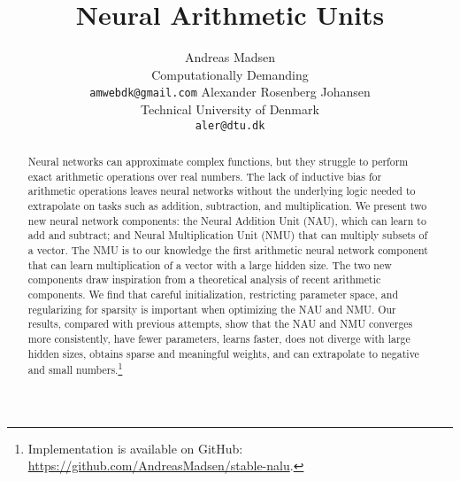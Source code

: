 \documentclass{article}
\title{Neural Arithmetic Units}
\author{%
  Andreas Madsen \\
  Computationally Demanding \\
  \texttt{amwebdk@gmail.com}
  \And
  Alexander Rosenberg Johansen \\
  Technical University of Denmark \\
  \texttt{aler@dtu.dk} \\
}
\begin{document}
\maketitle

\begin{abstract}


Neural networks can approximate complex functions, but they struggle to perform exact arithmetic operations over real numbers.
The lack of inductive bias for arithmetic operations leaves neural networks without the underlying logic needed to extrapolate on tasks such as addition, subtraction, and multiplication.
We present two new neural network components: the Neural Addition Unit (NAU), which can learn to add and subtract; and Neural Multiplication Unit (NMU) that can multiply subsets of a vector.
The NMU is to our knowledge the first arithmetic neural network component that can learn multiplication of a vector with a large hidden size.
The two new components draw inspiration from a theoretical analysis of recent arithmetic components.
We find that careful initialization, restricting parameter space, and regularizing for sparsity is important when optimizing the NAU and NMU.
Our results, compared with previous attempts, show that the NAU and NMU converges more consistently, have fewer parameters, learns faster, does not diverge with large hidden sizes, obtains sparse and meaningful weights, and can extrapolate to negative and small numbers.\ifdefined\nonanonymous\footnote{Implementation is available on GitHub: \url{https://github.com/AndreasMadsen/stable-nalu}.}\fi


\end{abstract}
\end{document}
